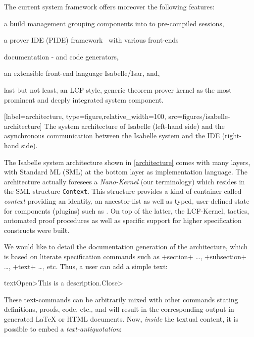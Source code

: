\begin{isabellebody}
\begin{isamarkuptext}
 The current system framework offers moreover the following features:
\begin{compactitem}
\item a build management grouping components into to pre-compiled sessions,
\item a prover IDE (PIDE) framework~\cite{wenzel:asynchronous:2014} with 
       various front-ends 
\item documentation - and code generators,
\item an extensible front-end language Isabelle/Isar, and,
\item last but not least, an LCF style, generic theorem prover kernel as 
  the most prominent and deeply integrated system component.
\end{compactitem}%
\end{isamarkuptext}\isamarkuptrue%
%
\isaDofFigure%
%
[label={architecture}, type={figure},relative_width={100},
      src={figures/isabelle-architecture}]%
{The system architecture of Isabelle (left-hand side) and the 
     asynchronous communication between the Isabelle system and 
     the IDE (right-hand side).}%
%
\begin{isamarkuptext}%
The Isabelle system architecture shown in \autoref{architecture}
 comes with many layers, with Standard ML (SML) at the bottom layer as implementation 
language. The architecture actually foresees a \emph{Nano-Kernel} (our terminology) which 
resides in the SML structure \texttt{Context}. This structure provides a kind of container called 
\emph{context} providing an identity, an ancestor-list as well as typed, user-defined state 
for components (plugins) such as \isadof. On top of the latter, the LCF-Kernel, tactics, 
automated proof procedures as well as specific support for higher specification constructs
were built.%
\end{isamarkuptext}\isamarkuptrue%
%
\begin{isamarkuptext}%
We would like to detail the documentation generation of the architecture,
which is based on literate specification commands such as \inlineisar+section+ \ldots, 
\inlineisar+subsection+ \ldots, \inlineisar+text+ \ldots, etc.
Thus, a user can add a simple text:
\begin{isar}
  text\<Open>This is a description.\<Close>
\end{isar}
These text-commands can be arbitrarily mixed with other commands stating definitions, proofs, code, etc.,
and will result in the corresponding output in generated \LaTeX{} or HTML documents. 
Now, \emph{inside} the textual content, it is possible to embed a \emph{text-antiquotation}:

\end{isamarkuptext}
\end{isabellebody}
